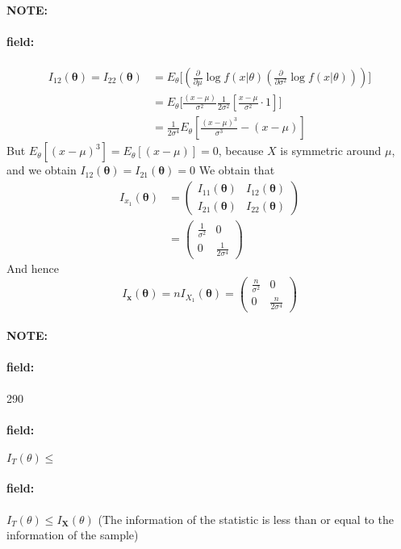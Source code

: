 \documentclass[12pt]{article}
\newenvironment{note}{\paragraph{NOTE:}}{}
\newenvironment{field}{\paragraph{field:}}{}
\begin{document}
\begin{note}
\begin{field}
    \begin{align*}
      I_{12}(\boldsymbol\theta) = I_{22}(\boldsymbol\theta) &= E_\theta \big[ ( \frac{\partial{}{}}{\partial{\mu}{}}\log f(x|\theta)(\frac{\partial{}{}}{\partial{\sigma^2}{    }} \log f(x|\theta)))\big]\\
      &=E_\theta \big[ \frac{(x-\mu)}{\sigma^2
      } \frac{1}{2\sigma^2} [\frac{x-\mu}{\sigma^2}\cdot 1]\big]\\
      &= \frac{1}{2\sigma^4} E_\theta[ \frac{(x-\mu)^3}{\sigma^3} - (x-\mu)]
    \end{align*}
    But $E_\theta[(x-\mu)^3] = E_\theta[(x - \mu)] = 0$, because $X$ is symmetric around $\mu$, and we obtain $I_{12}(\boldsymbol\theta) = I_{21}(\boldsymbol\theta) = 0$
    We obtain that
    \begin{align*}
      I_{x_1}(\boldsymbol\theta) &= \begin{pmatrix}
        I_{11}(\boldsymbol\theta) & I_{12}(\boldsymbol\theta)\\
        I_{21}(\boldsymbol\theta) & I_{22}(\boldsymbol\theta)
    \end{pmatrix}\\
    &= \begin{pmatrix}
      \frac{1}{\sigma^2} & 0 \\ 0 & \frac{1}{2\sigma^4}
    \end{pmatrix}
    \end{align*}
    And hence $$ I_{\mathbf{x}}(\boldsymbol\theta) = n I_{X_1}(\boldsymbol\theta) = \begin{pmatrix}
      \frac{n}{\sigma^2} & 0 \\ 0 & \frac{n}{2\sigma^4}
    \end{pmatrix} $$
  \end{field}
\end{note}

\begin{note} \begin{field} \tiny 290 \end{field}
  \begin{field}
    $I_T(\theta) \leq $
  \end{field}
  \begin{field}
    $I_T(\theta) \leq I_{\mathbf{X}}(\theta)$
    (The information of the statistic is less than or equal to the information of the sample)
  \end{field}
\end{note}
\end{document}
